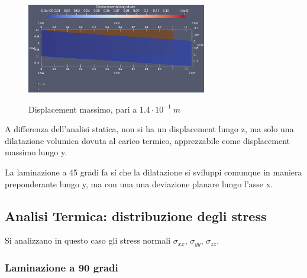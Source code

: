 \documentclass{article}
\begin{document}
            \begin{figure}[h!]
                 \label{fig:displacement_45_thermal}
                \centering
                \includegraphics[width=0.7\textwidth]{MUL2/Esercitazione3/MUL2_FEM/OUTPUT/static/Displacement_Z/displacement_thermal_45.eps}
                \caption{Displacement massimo, pari a $1.4 \cdot 10^{-1} \ m$}
            \end{figure}

            A differenza dell'analisi statica, non si ha un displacement lungo z, ma solo una dilatazione volumica dovuta
            al carico termico, apprezzabile come displacement massimo lungo y.

            La laminazione a 45 gradi fa sí che la dilatazione si sviluppi comunque in maniera preponderante lungo y, 
            ma con una una deviazione planare lungo l'asse x.

            \clearpage

            \subsection{Analisi Termica: distribuzione degli stress \label{termica_stress}}

            Si analizzano in questo caso gli stress normali $\sigma_{xx}$, $\sigma_{yy}$, $\sigma_{zz}$.

            \subsubsection{Laminazione a 90 gradi\label{termica_stress_90}}
\end{document}
